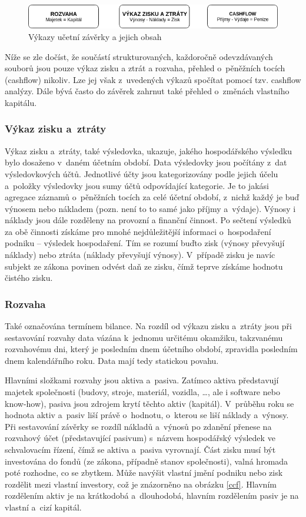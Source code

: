 \begin{figure}
  \centering
  \includegraphics[width=14cm]{img/vykazy.png}
  \caption{Výkazy učetní závěrky a jejich obsah \cite{komplex}}
\end{figure}

Níže se zle dočíst, že součástí strukturovaných, každoročně odevzdávaných souborů jsou pouze výkaz zisku a ztrát a rozvaha, přehled o~pěněžních tocích (cashflow) nikoliv. Lze jej však z~uvedených výkazů spočítat pomocí tzv. cashflow analýzy. Dále bývá často do závěrek zahrnut také přehled o~změnách vlastního kapitálu.

\subsubsection{Výkaz zisku a~ztráty}
Výkaz zisku a~ztráty, také výsledovka, ukazuje, jakého hospodářského výsledku bylo dosaženo v~daném účetním období. Data výsledovky jsou počítány z~dat výsledovkových účtů. Jednotlivé účty jsou kategorizovány podle jejich účelu a~položky výsledovky jsou sumy účtů odpovídající kategorie. Je to jakási agregace záznamů o~pěněžních tocích za celé účetní období, z~nichž každý je buď výnosem nebo nákladem (pozn. není to to samé jako příjmy a~výdaje). Výnosy i náklady jsou dále rozděleny na provozní a finanční činnost. Po sečtení výsledků za obě činnosti získáme pro mnohé nejdůležitější informaci o~hospodaření podniku -- výsledek hospodaření. Tím se rozumí buďto zisk (výnosy převyšují náklady) nebo ztráta (náklady převyšují výnosy). V~případě zisku je navíc subjekt ze zákona povinen odvést daň ze zisku, čímž teprve získáme hodnotu čistého zisku.

\subsubsection{Rozvaha}
Také označována termínem bilance. Na rozdíl od výkazu zisku a~ztráty jsou při sestavování rozvahy data vázána k~jednomu určitému okamžiku, takzvanému rozvahovému dni, který je posledním dnem účetního období, zpravidla posledním dnem kalendářního roku. Data mají tedy statickou povahu.

Hlavními složkami rozvahy jsou aktiva a~pasiva. Zatímco aktiva představují majetek společnosti (budovy, stroje, materiál, vozidla, \dots, ale i software nebo know-how), pasiva jsou zdrojem krytí těchto aktiv (kapitál). V~průběhu roku se hodnota aktiv a~pasiv liší právě o~hodnotu, o~kterou se liší náklady a~výnosy. Při sestavování závěrky se rozdíl nákladů a~výnosů po zdanění přenese na rozvahový účet (představující pasivum) s~názvem hospodářský výsledek ve schvalovacím řízení, čímž se aktiva a~pasiva vyrovnají. Část zisku musí být investována do fondů (ze zákona, případně stanov společnosti), valná hromada poté rozhodne, co se zbytkem. Může navýšit vlastní jmění podniku nebo zisk rozdělit mezi vlastní investory, což je znázorněno na obrázku \ref{ccf}. Hlavním rozdělením aktiv je na krátkodobá a~dlouhodobá, hlavním rozdělením pasiv je na vlastní a~cizí kapitál.




